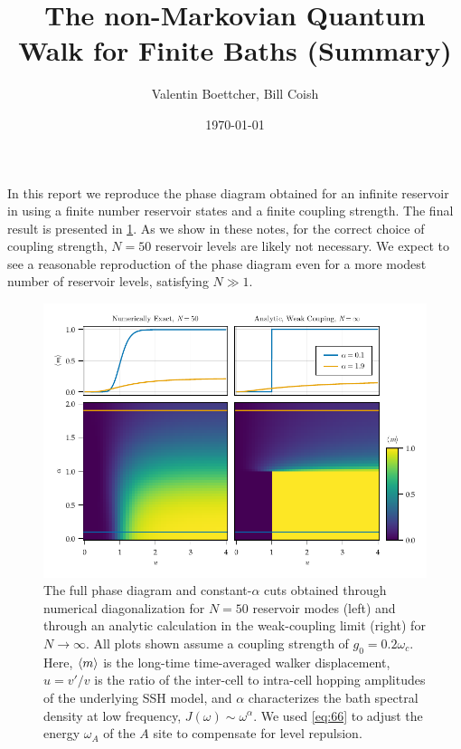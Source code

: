 \documentclass[fontsize=10pt,paper=b5,open=any,
twoside=no,toc=listof,toc=bibliography,headings=optiontohead,
captions=nooneline,captions=tableabove,english,DIV=15,numbers=noenddot,final,parskip=yes,
headinclude=true,footinclude=false,BCOR=0mm]{scrartcl}
\author{Valentin Boettcher, Bill Coish}
\title{The non-Markovian Quantum Walk for Finite Baths (Summary)}
\date{\today}
\begin{document}
\maketitle
In this report we reproduce the phase diagram obtained for an infinite
reservoir in  using a finite number reservoir
states and a finite coupling strength. The final result is presented
in \cref{fig:example_finite_vs_continuum}. As we show in these notes,
for the correct choice of coupling strength, \(N=50\) reservoir levels
are likely not necessary. We expect to see a reasonable reproduction
of the phase diagram even for a more modest number of reservoir
levels, satisfying \(N\gg 1\).

\begin{figure}[H]
  \centering
  \includegraphics{plots/example_finite_vs_continuum}
  \caption{\label{fig:example_finite_vs_continuum} The full phase
    diagram and constant-\(α\) cuts obtained through numerical
    diagonalization for \(N=50\) reservoir modes (left) and through an
    analytic calculation in the weak-coupling limit (right) for
    \(N\to ∞\). All plots shown assume a coupling strength of
    \(g_{0}=0.2 ω_{c}\). Here, \(\ev{m}\) is the long-time
    time-averaged walker displacement, \(u=v\prime/v\) is the ratio of
    the inter-cell to intra-cell hopping amplitudes of the underlying
    SSH model, and \(α\) characterizes the bath spectral density at
    low frequency, \(J(ω)\sim ω^{α}\). We used \cref{eq:66} to adjust
    the energy \(ω_{A}\) of the \(A\) site to compensate for level
    repulsion.}
\end{figure}
\end{document}
